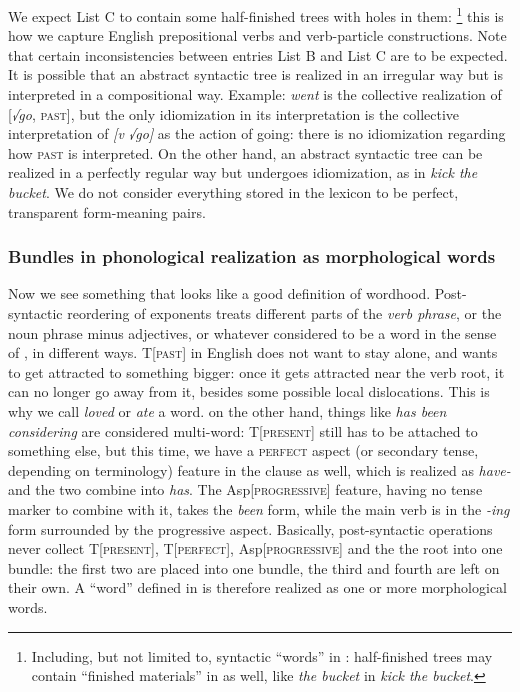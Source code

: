 \documentclass[a4paper, oneside, scheme=plain, 12pt]{article}
\newcommand*{\term}[1]{\emph{#1}}
\newcommand{\form}[1]{\emph{#1}}
\newcommand*{\category}[1]{\textsc{#1}}
\begin{document}
We expect List C to contain some half-finished trees with holes in them:%
\footnote{
    Including, but not limited to, syntactic ``words'' in :
    half-finished trees may contain ``finished materials'' in  as well,
    like \form{the bucket} in \form{kick the bucket}.
}
this is how we capture English prepositional verbs and verb-particle constructions.
Note that certain inconsistencies between entries List B and List C are to be expected.
It is possible that an abstract syntactic tree is realized in an irregular way but is interpreted in a compositional way.
Example: \form{went} is the collective realization of [\form{√go}, \category{past}],
but the only idiomization in its interpretation is the collective interpretation of \form{[v √go]}
as the action of going:
there is no idiomization regarding how \category{past} is interpreted.
On the other hand, an abstract syntactic tree can be realized in a perfectly regular way
but undergoes idiomization, as in \form{kick the bucket}.
We do not consider everything stored in the lexicon to be perfect, transparent form-meaning pairs.

\subsubsection{Bundles in phonological realization as morphological words}\label{sec:morphological-wordhood-production}

Now we see something that looks like a good definition of wordhood.
Post-syntactic reordering of exponents treats different parts of the \term{verb phrase},
or the noun phrase minus adjectives, or whatever considered to be a word in the sense of , in different ways.
T[\category{past}] in English does not want to stay alone,
and wants to get attracted to something bigger:
once it gets attracted near the verb root,
it can no longer go away from it, besides some possible local dislocations.
This is why we call \form{loved} or \form{ate} a word.
on the other hand, things like \form{has been considering} are considered multi-word:
T[\category{present}] still has to be attached to something else,
but this time, we have a \category{perfect} aspect (or secondary tense, depending on terminology) feature in the clause as well,
which is realized as \form{have-} and the two combine into \form{has}.
The Asp[\category{progressive}] feature, having no tense marker to combine with it,
takes the \form{been} form, while the main verb is in the \form{-ing} form surrounded by the progressive aspect.
Basically, post-syntactic operations never collect T[\category{present}], T[\category{perfect}], Asp[\category{progressive}] and the the root into one bundle:
the first two are placed into one bundle, the third and fourth are left on their own.
A ``word'' defined in 
is therefore realized as one or more morphological words.
\end{document}
